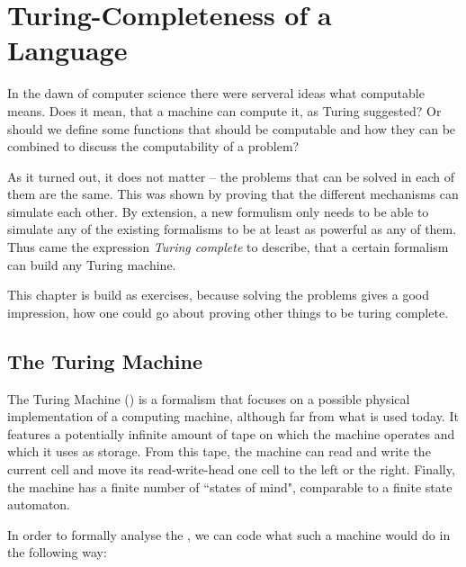 \section{Turing-Completeness of a Language}
\label{sec:Turing Completeness}
In the dawn of computer science there were serveral ideas what computable 
means. Does it mean, that a machine can compute it, as Turing suggested? Or 
should we define some functions that should be computable and how they can be
combined to discuss the computability of a problem?

As it turned out, it does not matter -- the problems that can be solved in 
each of them are the same. This was shown by proving that the different 
mechanisms can simulate each other. By extension, a new formulism only needs 
to be able to simulate any of the existing formalisms to be at least as 
powerful as any of them. Thus came the expression \emph{Turing complete} to 
describe, that a certain formalism can build any Turing machine.

This chapter is build as exercises, because solving the problems gives a good 
impression, how one could go about proving other things to be turing complete.

\subsection{The Turing Machine}
The Turing Machine (\TM) is a formalism that focuses on a possible physical 
implementation of a computing machine, although far from what is used today. 
It features a potentially infinite amount of tape on which the machine 
operates and which it uses as storage. From this tape, the machine can read and
write the current cell and move its read-write-head one cell to the left or the
right. Finally, the machine has a finite number of ``states of mind",
comparable to a finite state automaton.

In order to formally analyse the \TM, we can code what such a machine would 
do in the following way:

